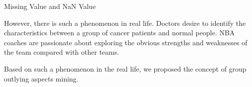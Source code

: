 \documentclass[
 size=12pt,
 paper=smartboard,  %
 mode=present, 		%
 display=slides, 	%
 style=tuliplab,  	%
 pauseslide,
 fleqn,leqno]{powerdot}
\begin{document}
\begin{slide}{Missing Value and NaN Value}

\begin{note}
However,
there is such a phenomenon in real life.
Doctors desire to identify the characteristics between
a group of cancer patients and normal people.
NBA coaches are passionate about exploring the obvious strengths and
weaknesses of the team compared with other teams.

Based on such a phenomenon in the real life,
we proposed the concept of group outlying aspects mining.
\end{note}

\end{slide}
\end{document}
